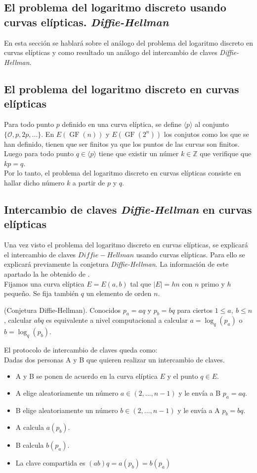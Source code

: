 \begin{aligned*}
\section{El problema del logaritmo discreto usando curvas elípticas. \emph{Diffie-Hellman}}
En esta sección se hablará sobre el análogo del problema del logaritmo discreto en curvas elípticas y como resultado un análogo del intercambio de claves \emph{Diffie-Hellman}.

\subsection{El problema del logaritmo discreto en curvas elípticas}
Para todo punto $p$ definido en una curva elíptica, se define $\langle p\rangle$ al conjunto $\{\mathcal{O}, p, 2p, ... \}$.
En $E(\operatorname{GF}(n))$ y $E(\operatorname{GF}(2^n))$ los conjutos como los que se han definido, tienen que ser finitos ya que los puntos de las curvas son finitos. Luego para todo punto $q\in \langle p\rangle$ tiene que existir un númer $k \in \mathbb{Z}$ que verifique que $kp=q$.\\
Por lo tanto, el problema del logaritmo discreto en curvas elípticas consiste en hallar dicho número $k$ a partir de $p$ y $q$.
\subsection{Intercambio de claves \emph{Diffie-Hellman} en curvas elípticas}
Una vez visto el problema del logaritmo discreto en curvas elípticas, se explicará el intercambio de claves $Diffie-Hellman$ usando curvas elípticas. Para ello se explicará previamente la conjetura \emph{Diffie-Hellman}. La información de este apartado la he obtenido de \cite{apuntesCriptografia}.\\
Fijamos una curva elíptica $E=E(a,b)$ tal que $|E|=hn$ con $n$ primo y $h$ pequeño. Se fija también $q$ un elemento de orden $n$.
\begin{definicion}
	(Conjetura Diffie-Hellman). Conocidos $p_a=aq$ y $p_b=bq$ para ciertos $1\leq a,\: b\leq n$, calcular $abq$ es equivalente a nivel computacional a calcular $a=\log_q(p_a)$ o $b=\log_q(p_b)$.
\end{definicion}
El protocolo de intercambio de claves queda como:\\

Dadas dos personas A y B que quieren realizar un intercambio de claves.
\begin{itemize}
	\item A y B se ponen de acuerdo en la curva elíptica $E$ y el punto $q\in E$.
	\item A elige aleatoriamente un número $a\in(2,...,n-1)$ y le envía a B $p_a=aq$.
	\item B elige aleatoriamente un número $b\in(2,...,n-1)$ y le envía a A $p_b=bq$.
	\item A calcula $a(p_b)$.
	\item B calcula $b(p_a)$.
	\item La clave compartida es $(ab)q=a(p_b)=b(p_a)$
\end{itemize}


\end{aligned*}
